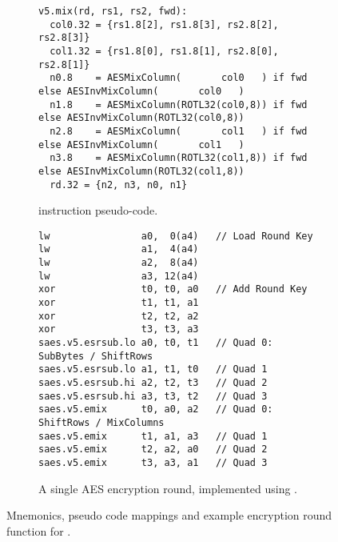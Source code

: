 \begin{figure}[h]
\begin{subfigure}{\textwidth}
\begin{lstlisting}[language=pseudo,style=block]
v5.mix(rd, rs1, rs2, fwd):
  col0.32 = {rs1.8[2], rs1.8[3], rs2.8[2], rs2.8[3]}
  col1.32 = {rs1.8[0], rs1.8[1], rs2.8[0], rs2.8[1]}
  n0.8    = AESMixColumn(       col0   ) if fwd else AESInvMixColumn(       col0   )
  n1.8    = AESMixColumn(ROTL32(col0,8)) if fwd else AESInvMixColumn(ROTL32(col0,8))
  n2.8    = AESMixColumn(       col1   ) if fwd else AESInvMixColumn(       col1   )
  n3.8    = AESMixColumn(ROTL32(col1,8)) if fwd else AESInvMixColumn(ROTL32(col1,8))
  rd.32 = {n2, n3, n0, n1}
\end{lstlisting}
\caption{
     instruction pseudo-code.
}
\label{fig:pseudo:v5}
\end{subfigure}
\begin{subfigure}{\textwidth}
\begin{lstlisting}[language=pseudo,style=block]
lw                a0,  0(a4)   // Load Round Key
lw                a1,  4(a4)
lw                a2,  8(a4)
lw                a3, 12(a4)
xor               t0, t0, a0   // Add Round Key
xor               t1, t1, a1
xor               t2, t2, a2
xor               t3, t3, a3
saes.v5.esrsub.lo a0, t0, t1   // Quad 0: SubBytes / ShiftRows
saes.v5.esrsub.lo a1, t1, t0   // Quad 1
saes.v5.esrsub.hi a2, t2, t3   // Quad 2
saes.v5.esrsub.hi a3, t3, t2   // Quad 3
saes.v5.emix      t0, a0, a2   // Quad 0: ShiftRows / MixColumns
saes.v5.emix      t1, a1, a3   // Quad 1
saes.v5.emix      t2, a2, a0   // Quad 2
saes.v5.emix      t3, a3, a1   // Quad 3
\end{lstlisting}
\caption{
A single AES encryption round, implemented using .
}
\label{fig:round:v5}
\end{subfigure}
\caption{
    Mnemonics, pseudo code mappings and example encryption
    round function for .
}
\end{figure}
